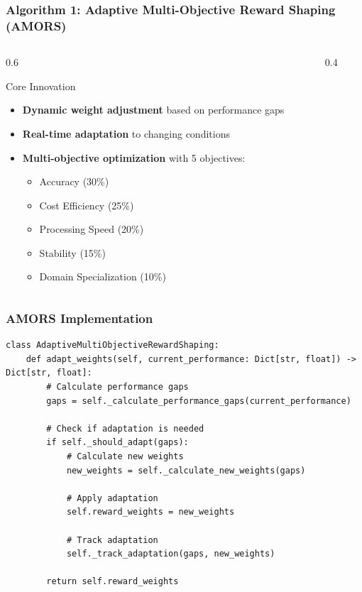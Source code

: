 \documentclass{beamer}
\begin{document}
\begin{frame}
\frametitle{Algorithm 1: Adaptive Multi-Objective Reward Shaping (AMORS)}
\begin{columns}
\begin{column}{0.6\textwidth}
\begin{block}{Core Innovation}
\begin{itemize}
\item \textbf{Dynamic weight adjustment} based on performance gaps
\item \textbf{Real-time adaptation} to changing conditions
\item \textbf{Multi-objective optimization} with 5 objectives:
    \begin{itemize}
    \item Accuracy (30\%)
    \item Cost Efficiency (25\%)
    \item Processing Speed (20\%)
    \item Stability (15\%)
    \item Domain Specialization (10\%)
    \end{itemize}
\end{itemize}
\end{block}
\end{column}
\begin{column}{0.4\textwidth}
\begin{center}
\end{center}
\end{column}
\end{columns}
\end{frame}

\begin{frame}[fragile]
\frametitle{AMORS Implementation}
\begin{lstlisting}
class AdaptiveMultiObjectiveRewardShaping:
    def adapt_weights(self, current_performance: Dict[str, float]) -> Dict[str, float]:
        # Calculate performance gaps
        gaps = self._calculate_performance_gaps(current_performance)
        
        # Check if adaptation is needed
        if self._should_adapt(gaps):
            # Calculate new weights
            new_weights = self._calculate_new_weights(gaps)
            
            # Apply adaptation
            self.reward_weights = new_weights
            
            # Track adaptation
            self._track_adaptation(gaps, new_weights)
        
        return self.reward_weights
\end{lstlisting}
\end{frame}
\end{document}
